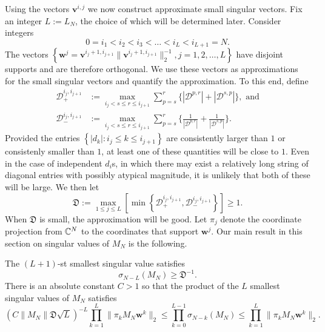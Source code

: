\documentclass{amsart}
\numberwithin{equation}{section}
\def\corAB{}
\def\corOZ{}
\begin{document}
\corAB{Using the vectors ${\bm v}^{i,j}$ we now construct approximate small singular vectors. Fix an integer $L:=L_N$, the choice of which will be determined later. Consider} integers
\[
  0 = i_1 < i_2 < i_3 < \dots < \corAB{i_L < i_{L+1}} = N.
\]
The vectors $\left\{ {\bm w}^j = {\bm v}^{i_j+1, i_{j+1}}\|{\bm v}^{i_j+1, i_{j+1}}\|_2^{-1} , j=1,2,\ldots,\corAB{L}\right\}$ have disjoint supports and are therefore orthogonal.  We use these vectors as approximations for the small singular vectors and quantify the approximation. To this end, define
\begin{equation}
  \label{eq:ddef}
    \begin{aligned}
      \mathcal{D}_{+}^{i_j,i_{j+1}}
      &:=
      \max_{i_j < s \leq r \leq i_{j+1}}
      \sum_{p=s}^{r} \bigl\{|\mathcal{D}^{p,r}|+ |\mathcal{D}^{s,p}|\bigr\}, \text{ and} \\
      \mathcal{D}_{-}^{i_j,i_{j+1}}
      &:=
      \max_{i_{j} < s\leq r \leq i_{j+1}}
      \sum_{p=s}^r \biggl\{\frac{1}{|\mathcal{D}^{p,r}|}+\frac{1}{|\mathcal{D}^{s,p}|}\biggr\}.
    \end{aligned}
  \end{equation}
  Provided the entries $\left\{ |d_k| : i_j \leq k \leq i_{j+1} \right\}$ are consistently larger than $1$ or consistenly smaller than $1$, at least one of these quantities will be close to $1.$
  Even in the case of independent $d_i$s, in which there may exist a relatively long string of diagonal entries with possibly atypical magnitude, it is unlikely that both of these will be large.
  We then let
\begin{equation}
  \mathfrak{D} := \max_{1 \leq j \leq \corOZ{L}}
  \left[
  \min\left\{
      \mathcal{D}_{+}^{i_j,i_{j+1}},
      \mathcal{D}_{-}^{i_j,i_{j+1}}
    \right\}\right]\geq 1.
  \label{eq:uniform}
\end{equation}
When $\mathfrak{D}$ is small, the approximation will be good.
Let $\pi_j$ denote the coordinate projection from $\mathbb{C}^N$ to the coordinates that support ${\bm w}^j.$  Our main result in this section on singular values of $M_N$ is the following.
\begin{theorem}
The $(\corAB{L} +1)$-st smallest singular value satisfies
\[
\sigma_{N-\corAB{L}}(M_N) \geq \mathfrak{D}^{-1}.
\]
There is an absolute constant $C> 1$ so that the product of the $\corAB{L}$ smallest singular values of $M_N$ satisfies
\begin{equation}\label{eq:thm31bd}
    (C\|M_N\| \mathfrak{D} \sqrt{\corAB{L}})^{-\corAB{L}}
    \prod_{k=1}^{\corAB{L}} \|\pi_k M_N {\bm w}^k\|_2
    \leq
    \prod_{k=0}^{\corAB{L}-1} \sigma_{N-k}(M_N)
    \leq
    \prod_{k=1}^{\corAB{L}} \|\pi_k M_N {\bm w}^k\|_2.
\end{equation}
\label{thm:DJssv}
\end{theorem}
\end{document}
